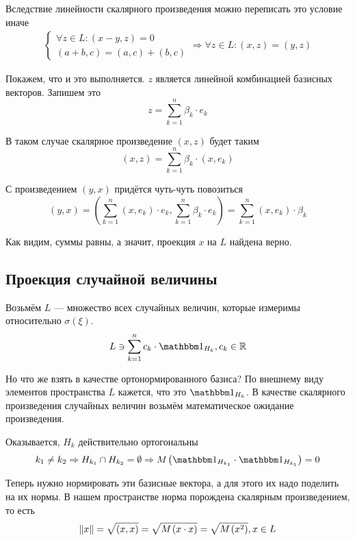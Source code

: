 Вследствие линейности скалярного произведения можно переписать это условие иначе
\begin{align*}
    \begin{cases}
        \forall z \in L: \left( x-y,z \right)=0\\
        \left( a+b,c \right)=\left( a,c \right)+\left( b,c \right)
    \end{cases}
    \Rightarrow \forall z \in L: \left( x,z \right)=\left( y,z \right)
\end{align*}

Покажем, что и это выполняется.
$z$ является линейной комбинацией базисных векторов. Запишем это
$$z = \sum_{k=1}^n \beta_k\cdot e_k$$

В таком случае скалярное произведение $\left( x,z \right)$ будет таким
$$\left( x,z \right)=\sum_{k=1}^n \beta_k\cdot \left( x,e_k \right)$$

С произведением $\left( y,x \right)$ придётся чуть-чуть повозиться
$$\left( y,x \right)
    =\left( \sum_{k=1}^n\left( x,e_k \right)\cdot e_k,
        \sum_{k=1}^n \beta_k\cdot e_k \right)
    =\sum_{k=1}^n \left( x,e_k \right)\cdot\beta_k$$

Как видим, суммы равны, а значит, проекция $x$ на $L$ найдена верно.

\subsection{Проекция случайной величины}
Возьмём $L$ --- множество всех случайных величин, которые
измеримы относительно $\sigma\left( \xi \right)$.
$$L \ni \sum_{k=1}^n c_k \cdot \indicatorof{H_k}, c_k \in \mathbb{R}$$

Но что же взять в качестве ортонормированного базиса?
По внешнему виду элементов пространства $L$ кажется,
что это $\indicatorof{H_k}$.
В качестве скалярного произведения случайных величин
возьмём математическое ожидание произведения.

Оказывается, $H_k$ действительно ортогональны
$$k_1 \neq k_2
    \Rightarrow H_{k_1} \cap H_{k_2} = \emptyset
    \Rightarrow
    \mean{\left( \indicatorof{H_{k_1}}\cdot \indicatorof{H_{k_1}} \right)} = 0$$

Теперь нужно нормировать эти базисные вектора,
а для этого их надо поделить на их нормы.
В нашем пространстве норма порождена скалярным произведением,
то есть
$$\left\| x \right\| = \sqrt{\left( x,x \right)}
    = \sqrt{M_{} \left( x \cdot x \right)}
    = \sqrt{M_{} \left( x^2 \right)}, x \in L$$

